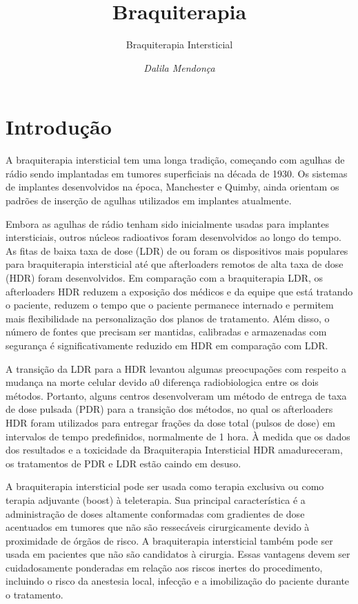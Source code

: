 \documentclass[11pt,a4paper]{article}
\title{\LobsterTwo\Huge{Braquiterapia}}
\author{\LobsterTwo\Large{Braquiterapia Intersticial}\nocite{*}}
\date{\LobsterTwo\textit{Dalila Mendonça}}
\begin{document}
	\maketitle

\section{Introdução}

	A braquiterapia intersticial tem uma longa tradição, começando com agulhas de rádio sendo implantadas em tumores superficiais na década de 1930. Os sistemas de implantes desenvolvidos na época, Manchester e Quimby, ainda orientam os padrões de inserção de agulhas utilizados em implantes atualmente.

	Embora as agulhas de rádio tenham sido inicialmente usadas para implantes intersticiais, outros núcleos radioativos foram desenvolvidos ao longo do tempo. As fitas de baixa taxa de dose (LDR) de  ou  foram os dispositivos mais populares para braquiterapia intersticial até que afterloaders remotos de alta taxa de dose (HDR) foram desenvolvidos. Em comparação com a braquiterapia LDR, os afterloaders HDR reduzem a exposição dos médicos e da equipe que está tratando o paciente, reduzem o tempo que o paciente permanece internado e permitem mais flexibilidade na personalização dos planos de tratamento. Além disso, o número de fontes que precisam ser mantidas, calibradas e armazenadas com segurança é significativamente reduzido em HDR em comparação com LDR.

	A transição da LDR para a HDR levantou algumas preocupações com respeito a mudança na morte celular devido a0 diferença radiobiologica entre os dois métodos. Portanto, alguns centros desenvolveram um método de entrega de taxa de dose pulsada (PDR) para a transição dos métodos, no qual os afterloaders HDR foram utilizados para entregar frações da dose total (pulsos de dose) em intervalos de tempo predefinidos, normalmente de 1 hora. À medida que os dados dos resultados e a toxicidade da Braquiterapia Intersticial HDR amadureceram, os tratamentos de PDR e  LDR estão caindo em desuso.

	A braquiterapia intersticial pode ser usada como terapia exclusiva ou como terapia adjuvante (boost) à teleterapia. Sua principal característica é a administração de doses altamente conformadas com gradientes de dose acentuados em tumores que não são ressecáveis cirurgicamente devido à proximidade de órgãos de risco. A braquiterapia intersticial também pode ser usada em pacientes que não são candidatos à cirurgia. Essas vantagens devem ser cuidadosamente ponderadas em relação aos riscos inertes do procedimento, incluindo o risco da anestesia local, infecção e a imobilização do paciente durante o tratamento.
\end{document}

